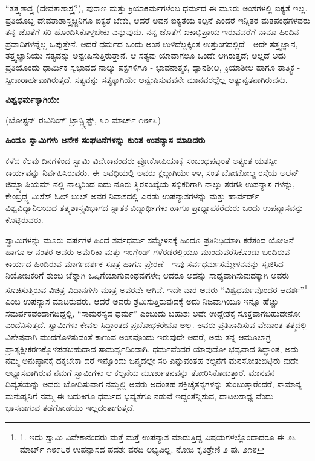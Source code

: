 “ತತ್ತ್ವಶಾಸ್ತ್ರ (ದೇವತಾಶಾಸ್ತ್ರ?), ಪುರಾಣ ಮತ್ತು ಕ್ರಿಯಾಕರ್ಮಗಳೆಂಬ ಧರ್ಮದ ಈ ಮೂರು ಅಂಶಗಳಲ್ಲಿ ಐಕ್ಯತೆ ಇಲ್ಲ. ಪ್ರತಿಯೊಬ್ಬ ದೇವತಾಶಾಸ್ತ್ರಜ್ಜನಿಗೂ ಐಕ್ಯತೆ ಬೇಕು, ಆದರೆ ಅವನ ಐಕ್ಯತೆಯ ಕಲ್ಪನೆ ಎಂದರೆ ಇನ್ನಿತರ ಮತಪಂಥಗಳವರು ತನ್ನ ಜೊತೆಗೆ ಸರಿ ಹೊಂದಿಸಿಕೊಳ್ಳಬೇಕು ಎನ್ನುವುದು. ನನ್ನ ಜೊತೆಗೆ ಏಕಾಭಿಪ್ರಾಯ ಇರುವವರೆಗೆ ನಾನೂ ಹಿಂದಿನ ಪ್ರವಾದಿಗಳನ್ನೆಲ್ಲ ಒಪ್ಪುತ್ತೇನೆ. ಆದರೆ ಧರ್ಮದ ಒಂದು ಅಂಶ ಉಳಿದೆಲ್ಲಕ್ಕಿಂತ ಉತ್ತುಂಗದಲ್ಲಿದೆ - ಅದೇ ತತ್ತ್ವಜ್ಞಾನ, ತತ್ತ್ವಜ್ಞಾನಿಯು ಸತ್ಯವನ್ನು ಅನ್ವೇಷಿಸುತ್ತಿರುತ್ತಾನೆ. ಆ ಸತ್ಯವು ಯಾವಾಗಲೂ ಒಂದೇ ಆಗಿರುತ್ತದೆ; ಅಲ್ಲದೆ ಅದು ಪ್ರತಿಯೊಂದು ಧಾರ್ಮಿಕ ಸ್ವಭಾವದ ನಾಲ್ಕು ಪಕ್ಷಗಳಿಗೂ - ಭಾವನಾತ್ಮಕ, ಧ್ಯಾನಶೀಲ, ಕ್ರಿಯಾಶೀಲ ಹಾಗೂ ತಾತ್ತ್ವಿಕ - ಸ್ವೀಕಾರಾರ್ಹವಾಗಿರುತ್ತದೆ. ಸತ್ಯವನ್ನು ಸತ್ಯಕ್ಕಾಗಿಯೇ ಅನ್ವೇಷಿಸುವವನೇ ಮಾನವರಲ್ಲೆಲ್ಲ ಅತ್ಯುನ್ನತನಾಗಿರುವನು.

\begin{center}
\textbf{ವಿಶ್ವಧರ್ಮಕ್ಕಾಗಿಯೇ}
\end{center}

\begin{center}
(ಬೋಸ್ಟನ್ ಈವಿನಿಂಗ್ ಟ್ರಾನ್ಸ್ಕ್ರಿಪ್ಟ್, ೩೦ ಮಾರ್ಚ್ ೧೮೯೬)
\end{center}

\textbf{ಹಿಂದೂ ಸ್ವಾಮಿಗಳು ಅನೇಕ ಸಂಘಟನೆಗಳನ್ನು ಕುರಿತ ಉಪನ್ಯಾಸ ಮಾಡಿದರು}

ಕಳೆದ ಕೆಲವು ದಿನಗಳಿಂದ ಸ್ವಾಮಿ ವಿವೇಕಾನಂದರು ಪ್ರೋಕೋಪಿಯಾಕ್ಕೆ ಸಂಬಂಧಪಟ್ಟಂತೆ ಅತ್ಯಂತ ಯಶಸ್ವೀ ಕಾರ್ಯವನ್ನು ನಿರ್ವಹಿಸಿರುವರು. ಈ ಅವಧಿಯಲ್ಲಿ ಅವರು ಕ್ಲಬ್ಗಾಗಿಯೇ ೪೪, ಸಂತ ಬೋಟೋಲ್ಙ ರಸ್ತೆಯ ಅಲೆನ್ ಜಿಮ್ನ್ಯಾಷಿಯಮ್​ ನಲ್ಲಿ ನಾಲ್ಕರಿಂದ ಐದು ನೂರು ಸ್ಥಿರಸಂಖ್ಯೆಯ ಸಭಿಕರಿಗಾಗಿ ನಾಲ್ಕು ತರಗತಿ ಉಪನ್ಯಾಸ ಗಳನ್ನು, ಕೇಂಬ್ರಿಡ್ಜ್ನ ಮಿಸೆಸ್ ಓಲ್ ಬುಲ್ ಅವರ ನಿವಾಸದಲ್ಲಿ ಎರಡು ಉಪನ್ಯಾಸಗಳನ್ನು ಮತ್ತು ಹಾರ್ವರ್ಡ್ ವಿಶ್ವವಿದ್ಯಾನಿಲಯದ ತತ್ತ್ವಶಾಸ್ತ್ರವಿಭಾಗದ ಸ್ನಾತಕ ವಿದ್ಯಾರ್ಥಿಗಳು ಹಾಗೂ ಪ್ರಾಧ್ಯಾಪಕರೆದುರು ಒಂದು ಉಪನ್ಯಾಸವನ್ನು ಕೊಟ್ಟಿರುವರು.

ಸ್ವಾಮಿಗಳನ್ನು ಮೂರು ವರ್ಷಗಳ ಹಿಂದೆ ಸರ್ವಧರ್ಮ ಸಮ್ಮೇಳನಕ್ಕೆ ಹಿಂದೂ ಪ್ರತಿನಿಧಿಯಾಗಿ ಕರೆತಂದ ಯೋಜನೆ ಹಾಗೂ ಆ ನಂತರ ಅವರು ಅಮೆರಿಕಾ ಮತ್ತು ಇಂಗ್ಲೆಂಡ್ ಗಳೆರಡರಲ್ಲಿಯೂ ಮುಂದುವರೆಸಿಕೊಂಡು ಬಂದಿರುವ ಕಾರ್ಯದ ಹಿಂದಿರುವ ಮಾರ್ಗದರ್ಶಕ ಸೂತ್ರ ಹಾಗೂ ಪ್ರೇರಣೆ - ಇವು ಸರ್ವಧರ್ಮಸಮ್ಮೇಳನವನ್ನು ಸೃಜಿಸಿದ ನಿಯೋಜಕರಿಗೆ ತುಂಬ ಚೆನ್ನಾಗಿ ಒಪ್ಪಿಗೆಯಾಗುವಂಥವುಗಳೇ; ಆದರೂ ಅದನ್ನು ಸಾಧ್ಯವಾಗಿಸುವುದಕ್ಕಾಗಿ ಅವರು ಸೂಚಿಸುತ್ತಿರುವ ವಿಚಿತ್ರ ವಿಧಾನಗಳು ಮಾತ್ರ ಅವರವೇ ಆಗಿವೆ. ಇದೇ ವಾರ ಅವರು “ವಿಶ್ವಧರ್ಮವೊಂದರ ಆದರ್ಶ”\footnote{1. ಇದು ಸ್ವಾಮಿ ವಿವೇಕಾನಂದರು ಮತ್ತೆ ಮತ್ತೆ ಉಪನ್ಯಾಸ ಮಾಡುತ್ತಿದ್ದ ವಿಷಯಗಳಲ್ಲೊಂದಾದರೂ ಈ ೨೬ ಮಾರ್ಚ್ ೧೮೯೬ರ ಉಪನ್ಯಾಸದ ಪದಶಃ ವರದಿ ಲಭ್ಯವಿಲ್ಲ. ನೋಡಿ ಕೃತಿಶ್ರೇಣಿ ೨ ಪು. ೨೧೮} ಎಂಬ ಉಪನ್ಯಾಸ ಮಾಡಿರುವರು. ಆದರೆ ಅವರು ಶ್ರಮಿಸುತ್ತಿರುವುದಕ್ಕೆ ಅದು ನಿಜವಾಗಿಯೂ ಇನ್ನೂ ಹೆಚ್ಚು ಸಮರ್ಪಕವೆಂದಾಗದಿದ್ದಲ್ಲಿ, “ಸಾಮರಸ್ಯದ ಧರ್ಮ” ಎಂಬುದು ಬಹುಶಃ ಅದೇ ಉದ್ದೇಶಕ್ಕೆ ಸೂಕ್ತವಾಗಬಹುದೇನೋ ಎಂದೆನಿಸುತ್ತದೆ. ಸ್ವಾಮಿಗಳು ಕೇವಲ ಸಿದ್ಧಾಂತದ ಪ್ರಬೋಧಕರೇನೂ ಅಲ್ಲ. ಅವರು ಪ್ರತಿಪಾದಿಸುವ ವೇದಾಂತ ತತ್ತ್ವದಲ್ಲಿ ವಿಶೇಷವಾಗಿ ಮುದಗೊಳಿಸುವಂತೆ ಕಾಣುವ ಅಂಶವೊಂದು ಇರುವುದೇ ಆದರೆ, ಅದು ತನ್ನ ಆಮೂಲಾಗ್ರ ಪ್ರಾತ್ಯಕ್ಷೀಕರಣಕ್ಕೊಳಪಡಬಹುದಾದ ಸಾಮರ್ಥ್ಯದಿಂದಾಗಿ. ಧರ್ಮವೆಂದರೆ ಯಾವುದೋ ಭವ್ಯವಾದ ಸಿದ್ಧಾಂತ, ಅದು ನಮ್ಮ ಅನುಷ್ಠಾನಕ್ಕೆ ದಕ್ಕಬೇಕಾ ದರೆ ಇನ್ನೊಂದು ಜನ್ಮದಲ್ಲೇ ಸರಿ ಎನ್ನುವಂತಹ ಕಲ್ಪನೆಗೆ ಮನಸೋತುಬಿಟ್ಟಿರು ವುದೇ ಅಭ್ಯಾಸವಾಗಿರುವ ನಮಗೆ ಸ್ವಾಮಿಗಳು ಆ ಕಲ್ಪನೆಯ ಮೂರ್ಖತನವನ್ನು ತೋರಿಸಿಕೊಡುತ್ತಾರೆ. ಮಾನವನ ದಿವ್ಯತೆಯನ್ನು ಅವರು ಬೋಧಿಸುವಾಗ ನಮ್ಮಲ್ಲಿ ಅವರು ಅದೆಂತಹ ಶಕ್ತಿಚೈತನ್ಯಗಳನ್ನು ತುಂಬುತ್ತಾರೆಂದರೆ, ಸಾಮಾನ್ಯ ಮನುಷ್ಯನಿಗೆ ನಮ್ಮ ಈ ಬದುಕಿಗೂ ಧರ್ಮದ ಭವ್ಯತೆಗೂ ನಡುವೆ ಇದ್ದಂತೆನ್ನಿಸುವ, ದಾಟಲಸಾಧ್ಯ ವೆಂದು ಭಾಸವಾಗುವ ತಡೆಗೋಡೆಯು ಇಲ್ಲದಂತಾಗುತ್ತದೆ.

